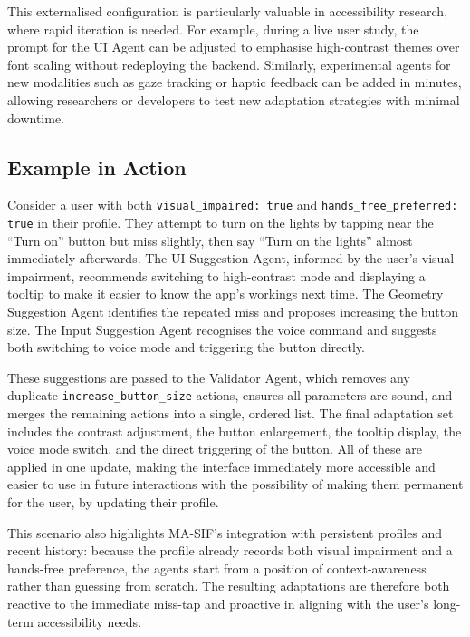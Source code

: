 \documentclass[openany]{book}
\begin{document}
This externalised configuration is particularly valuable in accessibility research, where rapid iteration is needed. 
For example, during a live user study, the prompt for the UI Agent can be adjusted to emphasise high-contrast themes over font scaling without redeploying the backend. 
Similarly, experimental agents for new modalities such as gaze tracking or haptic feedback can be added in minutes, allowing researchers or developers to test new adaptation strategies with minimal downtime.


\subsection{Example in Action}
Consider a user with both \texttt{visual\_impaired: true} and \texttt{hands\_free\_preferred: true} in their profile. They attempt to turn on the lights by tapping near the “Turn on” button but miss slightly, then say “Turn on the lights” almost immediately afterwards. The UI Suggestion Agent, informed by the user’s visual impairment, recommends switching to high-contrast mode and displaying a tooltip to make it easier to know the app's workings next time. The Geometry Suggestion Agent identifies the repeated miss and proposes increasing the button size. The Input Suggestion Agent recognises the voice command and suggests both switching to voice mode and triggering the button directly.

These suggestions are passed to the Validator Agent, which removes any duplicate \texttt{increase\_button\_size} actions, ensures all parameters are sound, and merges the remaining actions into a single, ordered list. The final adaptation set includes the contrast adjustment, the button enlargement, the tooltip display, the voice mode switch, and the direct triggering of the button. All of these are applied in one update, making the interface immediately more accessible and easier to use in future interactions with the possibility of making them permanent for the user, by updating their profile.

This scenario also highlights MA-SIF’s integration with persistent profiles and recent history: because the profile already records both visual impairment and a hands-free preference, the agents start from a position of context-awareness rather than guessing from scratch. The resulting adaptations are therefore both reactive to the immediate miss-tap and proactive in aligning with the user’s long-term accessibility needs.
\end{document}
